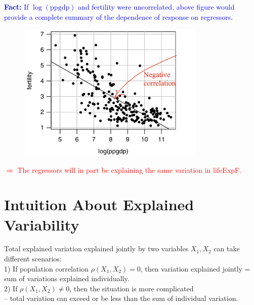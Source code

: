 \documentclass[14pt]{extarticle}
\begin{document}
\noindent
\textcolor{blue}{\textbf{Fact:} If $\log(\text{ppgdp})$ and fertility were uncorrelated, above figure would provide a complete summary of the dependence of response on regressors.}
\begin{figure}[H]
    \centering
    \includegraphics[width=0.8\textwidth]{fig2.png}
\end{figure}

\noindent
\textcolor{red}{$\Longrightarrow$ The regressors will in part be explaining the same variation in lifeExpF.}

\section*{Intuition About Explained Variability}

\noindent
Total explained variation explained jointly by two variables $X_1, X_2$ can take different scenarios:\\
1) If population correlation $\rho(X_1, X_2) = 0$, then variation explained jointly = sum of variations explained individually.\\
2) If $\rho(X_1, X_2) \neq 0$, then the situation is more complicated \\
\quad -- total variation can exceed or be less than the sum of individual variation.
\end{document}
